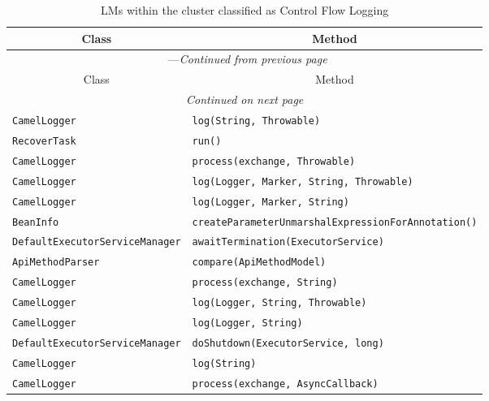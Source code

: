 \begin{center}
\begin{longtable}{ll}
\caption{LMs within the cluster classified as Control Flow Logging}\\
\toprule\multicolumn{1}{c}{Class}&\multicolumn{1}{c}{Method}\\\midrule
\endfirsthead

\multicolumn{2}{c}{\tablename\ \thetable{}---\textit{Continued from previous page}} \\\midrule
\multicolumn{1}{c}{Class}&\multicolumn{1}{c}{Method}\\\midrule
\endhead
\multicolumn{2}{c}{\textit{Continued on next page}}\\\midrule
\endfoot
\bottomrule
\endlastfoot

\lstinline/CamelLogger/&{\lstinline/log(String, Throwable)/}\\
\lstinline/RecoverTask/&{\lstinline/run()/}\\
\lstinline/CamelLogger/&{\lstinline/process(exchange, Throwable)/}\\
\lstinline/CamelLogger/&{\lstinline/log(Logger, Marker, String, Throwable)/}\\
\lstinline/CamelLogger/&{\lstinline/log(Logger, Marker, String)/}\\
\lstinline/BeanInfo/&{\lstinline/createParameterUnmarshalExpressionForAnnotation()/}\\
\lstinline/DefaultExecutorServiceManager/&{\lstinline/awaitTermination(ExecutorService)/}\\
\lstinline/ApiMethodParser/&{\lstinline/compare(ApiMethodModel)/}\\
\lstinline/CamelLogger/&{\lstinline/process(exchange, String)/}\\
\lstinline/CamelLogger/&{\lstinline/log(Logger, String, Throwable)/}\\
\lstinline/CamelLogger/&{\lstinline/log(Logger, String)/}\\
\lstinline/DefaultExecutorServiceManager/&{\lstinline/doShutdown(ExecutorService, long)/}\\
\lstinline/CamelLogger/&{\lstinline/log(String)/}\\
\lstinline/CamelLogger/&{\lstinline/process(exchange, AsyncCallback)/}\\
\end{longtable}
\end{center}

